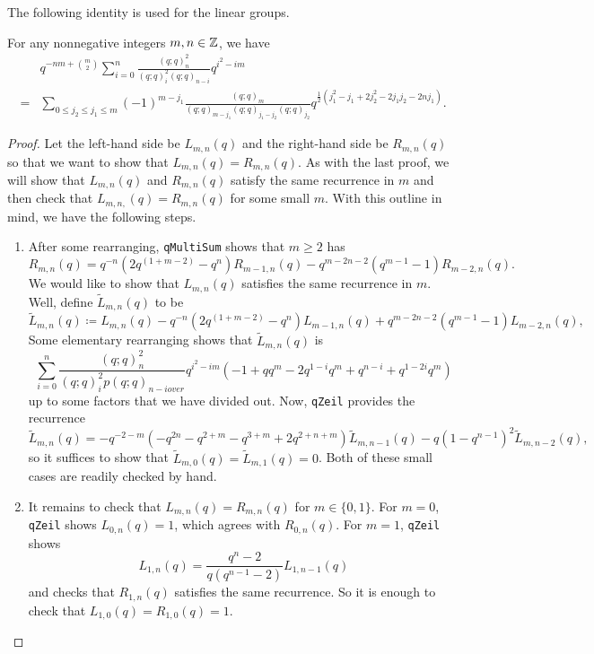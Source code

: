 The following identity is used for the linear groups.
\begin{prop}
    For any nonnegative integers $m,n\in\mathbb Z$, we have
    \begin{align*}
        &q^{-nm+\binom m2}\sum_{i=0}^{n}\frac{\left(q;q\right)_n^{2}}{\left(q;q\right)_i^{2}\left(q;q\right)_{n-i}}q^{i^{2}-im} \\
        ={}&\sum_{0\le j_2\le j_1\le m}\left(-1\right)^{m-j_{1}}\frac{\left(q;q\right)_m}{\left(q;q\right)_{m-j_{1}}\left(q;q\right)_{j_{1}-j_{2}}\left(q;q\right)_{j_{2}}}q^{\frac{1}{2}\left(j_{1}^2-j_1+2j_2^2-2j_1j_2-2nj_1\right)}.
    \end{align*}
\end{prop}
\begin{proof}
    Let the left-hand side be $L_{m,n}(q)$ and the right-hand side be $R_{m,n}(q)$ so that we want to show that $L_{m,n}(q)=R_{m,n}(q)$. As with the last proof, we will show that $L_{m,n}(q)$ and $R_{m,n}(q)$ satisfy the same recurrence in $m$ and then check that $L_{m,n,}(q)=R_{m,n}(q)$ for some small $m$. With this outline in mind, we have the following steps.
    \begin{enumerate}
        \item After some rearranging, \texttt{qMultiSum} shows that $m\ge2$ has
        \[R_{m,n}(q)=q^{-n}\left(2q^{\left(1+m-2\right)}-q^{n}\right)R_{m-1,n}(q)-q^{m-2n-2}\left(q^{m-1}-1\right)R_{m-2,n}(q).\]
        We would like to show that $L_{m,n}(q)$ satisfies the same recurrence in $m$. Well, define $\widetilde L_{m,n}(q)$ to be
        \[\widetilde L_{m,n}(q)\coloneqq L_{m,n}(q)-q^{-n}\left(2q^{\left(1+m-2\right)}-q^{n}\right)L_{m-1,n}(q)+q^{m-2n-2}\left(q^{m-1}-1\right)L_{m-2,n}(q),\]
        Some elementary rearranging shows that $\widetilde L_{m,n}(q)$ is
        \[\sum_{i=0}^{n}\frac{\left(q;q\right)_n^{2}}{\left(q;q\right)_i^{2}p\left(q;q\right)_{n-iover}}q^{i^{2}-im}\left(-1+qq^{m}-2q^{1-i}q^{m}+q^{n-i}+q^{1-2i}q^{m}\right)\]
        up to some factors that we have divided out. Now, \texttt{qZeil} provides the recurrence
        \[\widetilde L_{m,n}(q)=-q^{-2-m}\left(-q^{2n}-q^{2+m}-q^{3+m}+2q^{2+n+m}\right)\widetilde L_{m,n-1}(q)-q\left(1-q^{n-1}\right)^2\widetilde L_{m,n-2}(q),\]
        so it suffices to show that $\widetilde L_{m,0}(q)=\widetilde L_{m,1}(q)=0$. Both of these small cases are readily checked by hand.
        \item It remains to check that $L_{m,n}(q)=R_{m,n}(q)$ for $m\in\{0,1\}$. For $m=0$, \texttt{qZeil} shows $L_{0,n}(q)=1$, which agrees with $R_{0,n}(q)$. For $m=1$, \texttt{qZeil} shows
        \[L_{1,n}(q)=\frac{q^n-2}{q\left(q^{n-1}-2\right)}L_{1,n-1}(q)\]
        and checks that $R_{1,n}(q)$ satisfies the same recurrence. So it is enough to check that $L_{1,0}(q)=R_{1,0}(q)=1$.
        \qedhere
    \end{enumerate}
\end{proof}

